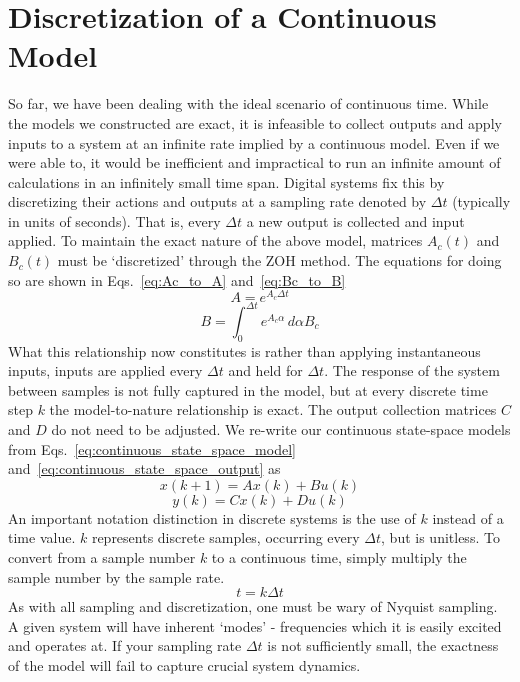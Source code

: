 \FloatBarrier\section{Discretization of a Continuous Model} %
So far, we have been dealing with the ideal scenario of continuous time. While the models we constructed are exact, it is infeasible to collect outputs and apply inputs to a system at an infinite rate implied by a continuous model. Even if we were able to, it would be inefficient and impractical to run an infinite amount of calculations in an infinitely small time span. 
Digital systems fix this by discretizing their actions and outputs at a sampling rate denoted by $\Delta t$ (typically in units of seconds).  That is, every $\Delta t$ a new output is collected and input applied. To maintain the exact nature of the above model, matrices $A_c(t)$ and $B_c(t)$ must be `discretized' through the \ac{ZOH} method. The equations for doing so are shown in Eqs.~\ref{eq:Ac_to_A} and~\ref{eq:Bc_to_B}
\begin{equation}
    A = e^{A_c \Delta t}
    \label{eq:Ac_to_A}
\end{equation}
\begin{equation}
    B = \int_{0}^{\Delta t}  e^{A_c \alpha}\,d\alpha B_c 
    \label{eq:Bc_to_B}
\end{equation}
What this relationship now constitutes is rather than applying instantaneous inputs, inputs are applied every $\Delta t$ and held for $\Delta t$. The response of the system between samples is not fully captured in the model, but at every discrete time step $k$ the model-to-nature relationship is exact. The output collection matrices $C$ and $D$ do not need to be adjusted. We re-write our continuous state-space models from Eqs.~\ref{eq:continuous_state_space_model} and~\ref{eq:continuous_state_space_output} as
\begin{equation}
    x(k+1) = Ax(k) + Bu(k)
    \label{eq:discrete_state_space_model}
\end{equation}
\begin{equation}
    y(k) = Cx(k) + Du(k)
    \label{eq:discrete_state_space_output}
\end{equation}
An important notation distinction in discrete systems is the use of $k$ instead of a time value. $k$ represents discrete samples, occurring every $\Delta t$, but is unitless. To convert from a sample number $k$ to a continuous time, simply multiply the sample number by the sample rate.
\begin{equation}
    t = k \Delta t
    \label{eq:samples_to_time}
\end{equation}
As with all sampling and discretization, one must be wary of Nyquist sampling. A given system will have inherent `modes' - frequencies which it is easily excited and operates at. If your sampling rate $\Delta t$ is not sufficiently small, the exactness of the model will fail to capture crucial system dynamics.

